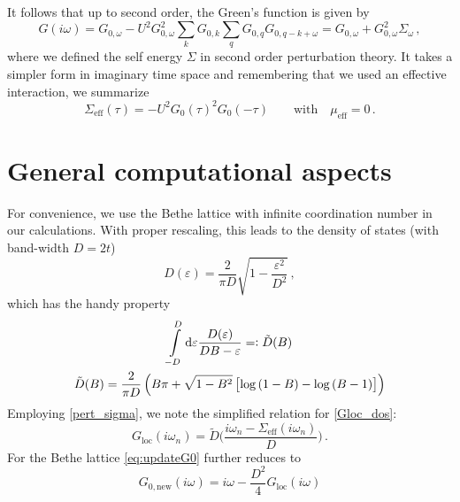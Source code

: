 \documentclass[11pt]{article}
\begin{document}
It follows that up to second order, the Green's function is given by
%
\begin{equation*}
G(i\omega) = G_{0, \omega} - U^2 G_{0,\omega}^2 
	\sum_k G_{0,k} \sum_{q} G_{0,q}G_{0,q-k+\omega}
	= G_{0, \omega} + G_{0,\omega}^2 \Sigma_{\omega}\,,
\end{equation*}
%
where we defined the self energy $\Sigma$ in second order perturbation theory. It takes a simpler form in imaginary time space and remembering that we used an effective interaction, we summarize 
%
\begin{equation}
\label{pert_sigma}
\Sigma_\mathrm{eff}(\tau) = - U^2 G_0(\tau)^2 G_0(-\tau)
\quad \quad
\text{with}
\quad 
\mu_{\text{eff}} = 0
\, .
\end{equation}


\section{General computational aspects}

For convenience, we use the Bethe lattice with infinite coordination number in our calculations. With proper rescaling, this leads to the density of states (with band-width $D=2t$)
%
\begin{equation}
D(\varepsilon) = \frac{2}{\pi D} \sqrt{ 1-\frac{\varepsilon^2}{D^2} }\,,
\end{equation}
%
which has the handy property \cite[p. 20]{bethepaper}
\begin{gather}
\int\limits_{-D}^{D} \dif \varepsilon 
\frac{D(\varepsilon)}{DB-\varepsilon} =: \tilde{D}(B) 
\\
\tilde{D}(B) = \frac{2}{\pi D} \left( B \pi + \sqrt{1-B^2}\left[\log{(1-B)}-\log{(B-1)}\right] \right)
\end{gather}
%
Employing \eqref{pert_sigma}, we note the simplified relation for \eqref{Gloc_dos}:
%
\begin{equation}
  G_{\text{loc}} (i\omega_n) = \tilde{D} \Big( \frac{i\omega_n-\Sigma_\mathrm{eff}(i\omega_n)}{D} \Big)
\, .
\end{equation}
For the Bethe lattice \eqref{eq:updateG0} further reduces to \cite[p. 22]{bethepaper}
\begin{equation}
  G_{0,\mathrm{new}}(iω) = i ω - \frac{D^2}{4} G_\mathrm{loc}(iω)
\end{equation}
\end{document}
